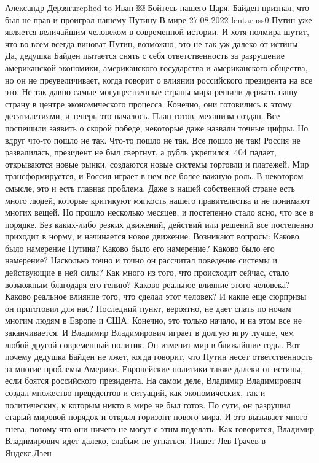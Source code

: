  
 
 
 
 

Александр Дерзягаreplied to Иван
￼
Бойтесь нашего Царя. Байден признал, что был не прав и проиграл нашему Путину
В мире
27.08.2022 lentaruss0
Путин уже является величайшим человеком в современной истории. И хотя полмира шутит, что во всем всегда виноват Путин, возможно, это не так уж далеко от истины. Да, дедушка Байден пытается снять с себя ответственность за разрушение американской экономики, американского государства и американского общества, но он не преувеличивает, когда говорит о влиянии российского президента на все это.
Не так давно самые могущественные страны мира решили держать нашу страну в центре экономического процесса. Конечно, они готовились к этому десятилетиями, и теперь это началось. План готов, механизм создан. Все поспешили заявить о скорой победе, некоторые даже назвали точные цифры. Но вдруг что-то пошло не так.
Что-то пошло не так.
Все пошло не так!
Россия не развалилась, президент не был свергнут, а рубль укрепился. 404 падает, открываются новые рынки, создаются новые системы торговли и платежей. Мир трансформируется, и Россия играет в нем все более важную роль. В некотором смысле, это и есть главная проблема.
Даже в нашей собственной стране есть много людей, которые критикуют мягкость нашего правительства и не понимают многих вещей. Но прошло несколько месяцев, и постепенно стало ясно, что все в порядке. Без каких-либо резких движений, действий или решений все постепенно приходит в норму, и начинается новое движение.
Возникают вопросы: Каково было намерение Путина? Каково было его намерение? Каково было его намерение? Насколько точно и точно он рассчитал поведение системы и действующие в ней силы? Как много из того, что происходит сейчас, стало возможным благодаря его гению? Каково реальное влияние этого человека? Каково реальное влияние того, что сделал этот человек?
И какие еще сюрпризы он приготовил для нас?
Последний пункт, вероятно, не дает спать по ночам многим людям в Европе и США. Конечно, это только начало, и на этом все не заканчивается. И Владимир Владимирович играет в долгую игру лучше, чем любой другой современный политик. Он изменит мир в ближайшие годы.
Вот почему дедушка Байден не лжет, когда говорит, что Путин несет ответственность за многие проблемы Америки. Европейские политики также далеки от истины, если боятся российского президента. На самом деле, Владимир Владимирович создал множество прецедентов и ситуаций, как экономических, так и политических, к которым никто в мире не был готов. По сути, он разрушил старый мировой порядок и открыл горизонт нового мира. И это вызывает много гнева, потому что они ничего не могут с этим поделать.
Как говорится, Владимир Владимирович идет далеко, слабым не угнаться.
Пишет Лев Грачев в Яндекс.Дзен
